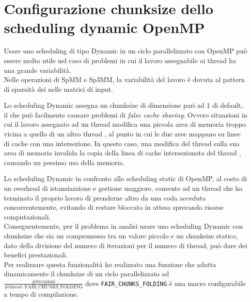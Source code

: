 \section{Configurazione chunksize dello scheduling dynamic OpenMP} \label{chSpMMAux:dynChunkFairAdapting}
Usare uno scheduling di tipo Dynamic in un ciclo parallelizzato con OpenMP 
può essere molto utile nel caso di problemi in cui il lavoro assegnabile ai thread ha una grande variabilità.\\
Nelle operazioni di SpMM e Sp3MM, la variabilità del lavoro è dovuta 
al pattern di sparsità dei \nnz nelle matrici di input.\\
\par\null\par
Lo scheduling Dynamic assegna un chunksize di dimensione pari ad 1 di default, 
il che può facilmente causare problemi di \emph{false cache sharing}.
Ovvero situazioni in cui il lavoro assegnato ad un thread  modifica una piccola area di memoria
troppo vicina a quello di un altro thread , 
al punto in cui le due aree mappano su linee di cache con una intersezione. 
In questo caso, una modifica del thread  sulla sua area di memoria invalida la 
copia della linea di cache intersezionata del thread , causando un pessimo uso della memoria.\\
\par\null\par
Lo scheduling Dynamic in confronto allo scheduling static di OpenMP, al costo di un overhead di istanziazzione e gestione maggiore,
consente ad un thread che ha terminato il proprio lavoro di prenderne altro da una coda acceduta concorrentemente,
evitando di restare bloccato in attesa sprecando risorse computazionali.\\
Conseguentemente, per il problema in analisi usare uno scheduling Dynamic con chunksize che sia un compromesso tra un valore piccolo e un 
chunksize statico, dato della divisione del numero di iterazioni per il numero di thread,
può dare dei benefici prestazionali.\\
Per realizzare questa funzionalità ho realizzato una funzione che adatta dinamicamente 
il chunksize di un ciclo parallelizzato ad $\frac{\#\text{iterazioni}}{\# \text{thread} \cdot \text{FAIR\_CHUNKS\_FOLDING}}$
dove \verb|FAIR_CHUNKS_FOLDING| è una macro configurabile a tempo di compilazione.\\

